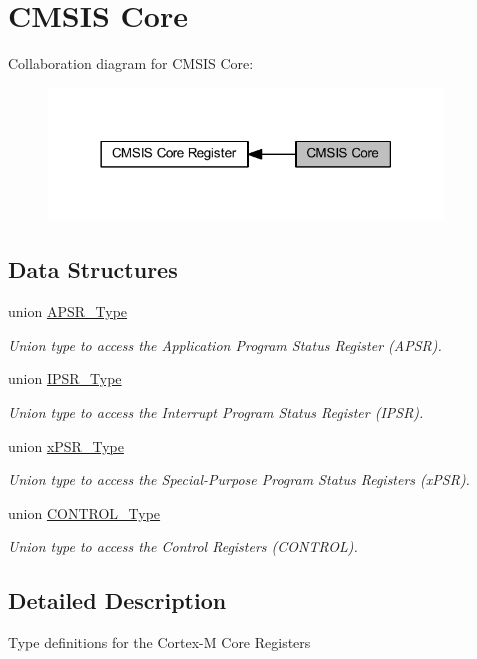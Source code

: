 \hypertarget{group___c_m_s_i_s___c_o_r_e}{}\section{C\+M\+S\+IS Core}
\label{group___c_m_s_i_s___c_o_r_e}
Collaboration diagram for C\+M\+S\+IS Core\+:
\nopagebreak
\begin{figure}[H]
\begin{center}
\leavevmode
\includegraphics[width=297pt]{group___c_m_s_i_s___c_o_r_e}
\end{center}
\end{figure}
\subsection*{Data Structures}
\begin{DoxyCompactItemize}
\item 
union \hyperlink{union_a_p_s_r___type}{A\+P\+S\+R\+\_\+\+Type}
\begin{DoxyCompactList}\small\item\em Union type to access the Application Program Status Register (A\+P\+SR). \end{DoxyCompactList}\item 
union \hyperlink{union_i_p_s_r___type}{I\+P\+S\+R\+\_\+\+Type}
\begin{DoxyCompactList}\small\item\em Union type to access the Interrupt Program Status Register (I\+P\+SR). \end{DoxyCompactList}\item 
union \hyperlink{unionx_p_s_r___type}{x\+P\+S\+R\+\_\+\+Type}
\begin{DoxyCompactList}\small\item\em Union type to access the Special-\/\+Purpose Program Status Registers (x\+P\+SR). \end{DoxyCompactList}\item 
union \hyperlink{union_c_o_n_t_r_o_l___type}{C\+O\+N\+T\+R\+O\+L\+\_\+\+Type}
\begin{DoxyCompactList}\small\item\em Union type to access the Control Registers (C\+O\+N\+T\+R\+OL). \end{DoxyCompactList}\end{DoxyCompactItemize}


\subsection{Detailed Description}
Type definitions for the Cortex-\/M Core Registers 